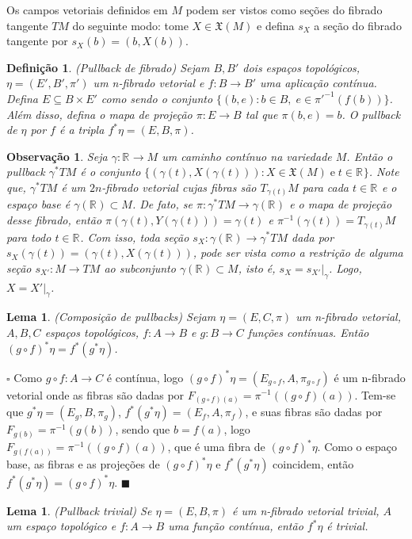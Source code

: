 \documentclass[12pt]{book}
\newtheorem{lema}[teorema]{Lema}
\newtheorem{definicao}[teorema]{Definição}
\newtheorem{observacao}[teorema]{Observação}
\newenvironment{prova}[1]{$\square$ #1}{\hfill$\blacksquare$}
\newcommand{\campossuaves}[1]{\mathfrak{X}(#1)}
\newcommand{\espacotangenteponto}[2]{T_{#1}#2}
\newcommand{\pullbackfibradotangente}[2]{#1^{*}T#2}
\newcommand{\pullbackfibradotangenteM}[1]{\pullbackfibradotangente{#1}{M}}
\newcommand{\real}[1]{\mathbb{R}^{#1}}
\newcommand{\reta}{\real{}}
\begin{document}
	Os campos vetoriais definidos em $M$ podem ser vistos como seções do fibrado tangente $TM$ do seguinte modo: tome $X\in \campossuaves{M}$ e defina $s_{X}$ a seção do fibrado tangente por $s_{X}(b) = (b, X(b))$.
	
	\begin{definicao}
		(Pullback de fibrado) Sejam $B, B'$ dois espaços topológicos, $\eta=(E', B', \pi')$ um n-fibrado vetorial e $f:B\to B'$ uma aplicação contínua. Defina $E \subseteq B\times E'$ como sendo o conjunto $\{(b, e): b \in B,\; e \in \pi'^{-1}(f(b)) \}$. Além disso, defina o mapa de projeção $\pi:E\to B$ tal que $\pi(b,e) = b$. O pullback de $\eta$ por $f$ é a tripla $f^{*}\eta = (E,B, \pi)$.
	\end{definicao}
	
	\begin{observacao}\label{observacao_pullback_fibrado_tangente}
		Seja $\gamma:\reta \to M$ um caminho contínuo na variedade $M$. Então o pullback $\pullbackfibradotangenteM{\gamma}$ é o conjunto $\{(\gamma(t), X(\gamma(t))): X\in \campossuaves{M} \; \text{e}\; t \in \reta \}$. Note que, $\pullbackfibradotangenteM{\gamma}$ é um $2n$-fibrado vetorial cujas fibras são $\espacotangenteponto{\gamma(t)}{M}$ para cada $t\in \reta$ e o espaço base é $\gamma(\reta)\subset M$. De fato, se $\pi: \pullbackfibradotangenteM{\gamma} \to \gamma(\reta)$ e o mapa de projeção desse fibrado, então $\pi(\gamma(t), Y(\gamma(t))) = \gamma(t)$ e $\pi^{-1}(\gamma(t)) = \espacotangenteponto{\gamma(t)}{M}$ para todo $t\in \reta$. Com isso, toda seção $s_{X}: \gamma(\reta)\to \pullbackfibradotangenteM{\gamma}$ dada por $s_{X}(\gamma(t)) = (\gamma(t), X(\gamma(t)))$, pode ser vista como a restrição de alguma seção $s_{X'}: M\to TM$ ao subconjunto $\gamma(\reta) \subset M$, isto é, $s_{X}= s_{X'}|_{\gamma}$. Logo, $X=X'|_{\gamma}$.
	\end{observacao}
	
	\begin{lema}\label{pullback_composicao}
		(Composição de pullbacks) Sejam $\eta =(E, C, \pi)$ um n-fibrado vetorial, $A, B, C$ espaços topológicos, $f:A\to B$ e $g:B\to C$ funções contínuas. Então $(g\circ f)^{*} \eta= f^{*}(g^{*}\eta)$.
	\end{lema}
	\begin{prova}
		Como $g\circ f:A\to C$ é contínua, logo $(g\circ f)^{*}\eta = (E_{g\circ f}, A, \pi_{g\circ f})$ é um n-fibrado vetorial onde as fibras são dadas por $F_{(g\circ f)(a)} = \pi^{-1}((g\circ f)(a))$. Tem-se que $g^{*}\eta=(E_{g}, B, \pi_{g})$, $f^{*}(g^{*}\eta) = (E_{f}, A, \pi_{f})$, e suas fibras são dadas por $F_{g(b)} = \pi^{-1}(g(b))$, sendo que $b=f(a)$, logo  $F_{g(f(a))} = \pi^{-1}((g \circ f)(a))$, que é uma fibra de $(g\circ f)^{*}\eta$. Como o espaço base, as fibras e as projeções de $(g\circ f)^{*}\eta$ e $f^{*}(g^{*}\eta)$ coincidem, então $f^{*}(g^{*}\eta) = (g\circ f)^{*}\eta$.
	\end{prova}
	\begin{lema}\label{pullback_trivial}
		(Pullback trivial) Se $\eta = (E, B, \pi)$ é um n-fibrado vetorial trivial, $A$ um espaço topológico e $f:A\to B$ uma função contínua, então $f^{*}\eta$ é trivial.
	\end{lema}
	
\end{document}
